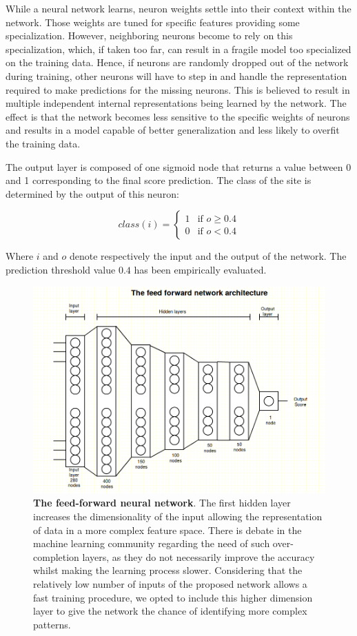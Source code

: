 While a neural network learns, neuron weights settle into their context within the network. Those weights are tuned for specific features providing some specialization. However, neighboring neurons become to rely on this specialization, which, if taken too far, can result in a fragile model too specialized on the training data. Hence, if neurons are randomly dropped out of the network during training, other neurons will have to step in and handle the representation required to make predictions for the missing neurons. This is believed to result in multiple independent internal representations being learned by the network. The effect is that the network becomes less sensitive to the specific weights of neurons and results in a model capable of better generalization and less likely to overfit the training data.    

The output layer is composed of one sigmoid node that returns a value between 0 and 1 corresponding to the final score prediction. The class of the site is determined by the output of this neuron:

\[class(i) = 
\begin{cases} 
	1 & \text{if } o \geq 0.4 \\
	0 & \text{if } o < 0.4
\end{cases}
\]

Where $i$ and $o$ denote respectively the input and the output of the network. The prediction threshold value $0.4$ has been empirically evaluated. 


\begin{figure}[hbt!]
	\centering
	\includegraphics[width=\textwidth, height=0.52\textheight]{Figures/NN}
	\caption{\textbf{The feed-forward neural network}. The first hidden layer increases the dimensionality of the input allowing the representation of data in a more complex feature space. There is debate in the machine learning community regarding the need of such over-completion layers, as they do not necessarily improve the accuracy whilst making the learning process slower. Considering that the relatively low number of inputs of the proposed network allows a fast training procedure, we opted to include this higher dimension layer to give the network the chance of identifying more complex patterns.}
	\label{fig:NN}
\end{figure}

